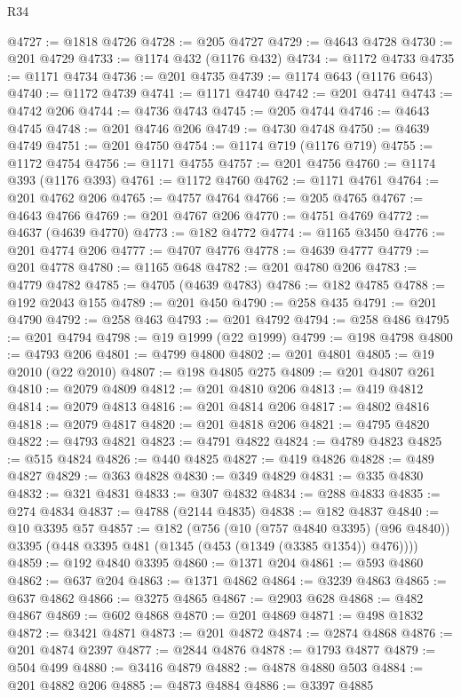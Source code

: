 \begin{lexlean}{R34}
\begin{coremodule}
@4727 := @1818 @4726
@4728 := @205 @4727
@4729 := @4643 @4728
@4730 := @201 @4729
@4733 := @1174 @432 (@1176 @432)
@4734 := @1172 @4733
@4735 := @1171 @4734
@4736 := @201 @4735
@4739 := @1174 @643 (@1176 @643)
@4740 := @1172 @4739
@4741 := @1171 @4740
@4742 := @201 @4741
@4743 := @4742 @206
@4744 := @4736 @4743
@4745 := @205 @4744
@4746 := @4643 @4745
@4748 := @201 @4746 @206
@4749 := @4730 @4748
@4750 := @4639 @4749
@4751 := @201 @4750
@4754 := @1174 @719 (@1176 @719)
@4755 := @1172 @4754
@4756 := @1171 @4755
@4757 := @201 @4756
@4760 := @1174 @393 (@1176 @393)
@4761 := @1172 @4760
@4762 := @1171 @4761
@4764 := @201 @4762 @206
@4765 := @4757 @4764
@4766 := @205 @4765
@4767 := @4643 @4766
@4769 := @201 @4767 @206
@4770 := @4751 @4769
@4772 := @4637 (@4639 @4770)
@4773 := @182 @4772
@4774 := @1165 @3450
@4776 := @201 @4774 @206
@4777 := @4707 @4776
@4778 := @4639 @4777
@4779 := @201 @4778
@4780 := @1165 @648
@4782 := @201 @4780 @206
@4783 := @4779 @4782
@4785 := @4705 (@4639 @4783)
@4786 := @182 @4785
@4788 := @192 @2043 @155
@4789 := @201 @450
@4790 := @258 @435
@4791 := @201 @4790
@4792 := @258 @463
@4793 := @201 @4792
@4794 := @258 @486
@4795 := @201 @4794
@4798 := @19 @1999 (@22 @1999)
@4799 := @198 @4798
@4800 := @4793 @206
@4801 := @4799 @4800
@4802 := @201 @4801
@4805 := @19 @2010 (@22 @2010)
@4807 := @198 @4805 @275
@4809 := @201 @4807 @261
@4810 := @2079 @4809
@4812 := @201 @4810 @206
@4813 := @419 @4812
@4814 := @2079 @4813
@4816 := @201 @4814 @206
@4817 := @4802 @4816
@4818 := @2079 @4817
@4820 := @201 @4818 @206
@4821 := @4795 @4820
@4822 := @4793 @4821
@4823 := @4791 @4822
@4824 := @4789 @4823
@4825 := @515 @4824
@4826 := @440 @4825
@4827 := @419 @4826
@4828 := @489 @4827
@4829 := @363 @4828
@4830 := @349 @4829
@4831 := @335 @4830
@4832 := @321 @4831
@4833 := @307 @4832
@4834 := @288 @4833
@4835 := @274 @4834
@4837 := @4788 (@2144 @4835)
@4838 := @182 @4837
@4840 := @10 @3395 @57
@4857 := @182
    (@756
      (@10 (@757 @4840 @3395) (@96 @4840))
      @3395
      (@448 @3395 @481 (@1345 (@453 (@1349 (@3385 @1354)) @476))))
@4859 := @192 @4840 @3395
@4860 := @1371 @204
@4861 := @593 @4860
@4862 := @637 @204
@4863 := @1371 @4862
@4864 := @3239 @4863
@4865 := @637 @4862
@4866 := @3275 @4865
@4867 := @2903 @628
@4868 := @482 @4867
@4869 := @602 @4868
@4870 := @201 @4869
@4871 := @498 @1832
@4872 := @3421 @4871
@4873 := @201 @4872
@4874 := @2874 @4868
@4876 := @201 @4874 @2397
@4877 := @2844 @4876
@4878 := @1793 @4877
@4879 := @504 @499
@4880 := @3416 @4879
@4882 := @4878 @4880 @503
@4884 := @201 @4882 @206
@4885 := @4873 @4884
@4886 := @3397 @4885

\end{coremodule}
\end{lexlean}
